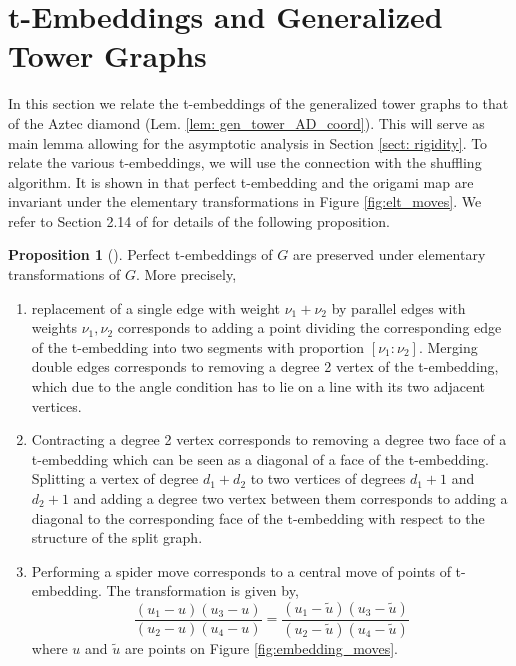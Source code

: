\documentclass[12pt]{amsart}
\numberwithin{equation}{section}
\theoremstyle{definition}
\newtheorem{prop}[thm]{Proposition}
\begin{document}
\section{t-Embeddings and Generalized Tower Graphs}
\label{sect: t_embedding}
In this section we relate the t-embeddings of the generalized tower graphs to that of the Aztec diamond (Lem. \ref{lem: gen_tower_AD_coord}). This will serve as main lemma allowing for the asymptotic analysis in Section \ref{sect: rigidity}. To relate the various t-embeddings, we will use the connection with the shuffling algorithm. It is shown in \cite{circle_pattern} that perfect t-embedding and the origami map  are invariant under the elementary transformations in Figure  \ref{fig:elt_moves}. We refer to Section 2.14 of \cite{tower_AD_perfect} for details of the following proposition.
\begin{prop}[\cite{circle_pattern, tower_AD_perfect}]
\label{prop:t_embedding_invariant}
    Perfect t-embeddings of $G$ are preserved under elementary transformations of ${G}$. More precisely,
    \begin{enumerate}
        \item  replacement of a single edge with weight $\nu_1+\nu_2$ by parallel edges with weights $\nu_1, \nu_2$ corresponds to adding a point dividing the corresponding edge of the t-embedding into two segments with proportion $\left[\nu_1: \nu_2\right]$. Merging double edges corresponds to removing a degree 2 vertex of the t-embedding, which due to the angle condition has to lie on a line with its two adjacent vertices.
        \item Contracting a degree 2 vertex corresponds to removing a degree two face of a t-embedding which can be seen as a diagonal of a face of the t-embedding. Splitting a vertex of degree $d_1+d_2$ to two vertices of degrees $d_1+1$ and $d_2+1$ and adding a degree two vertex between them corresponds to adding a diagonal to the corresponding face of the t-embedding with respect to the structure of the split graph.
        \item Performing a spider move corresponds to a central move of points of t-embedding. The transformation is given by,
        $$
        \frac{\left(u_1-u\right)\left(u_3-u\right)}{\left(u_2-u\right)\left(u_4-u\right)}=\frac{\left(u_1-\tilde{u}\right)\left(u_3-\tilde{u}\right)}{\left(u_2-\tilde{u}\right)\left(u_4-\tilde{u}\right)}
        $$
        where $u$ and $\tilde u$ are points on Figure \ref{fig:embedding_moves}.
    \end{enumerate}
\end{prop}
\end{document}
